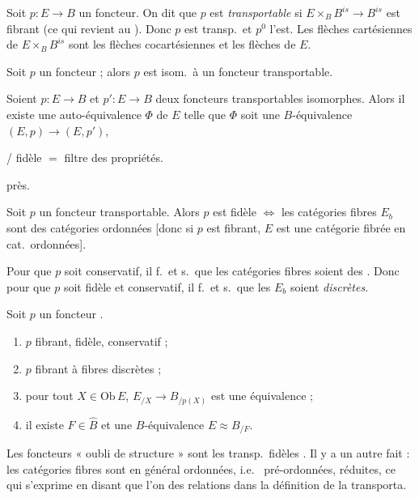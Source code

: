 \documentclass[11pt,a4paper]{article}
\begin{document}
Soit $p : E \to B$ un foncteur. On dit que $p$ est \emph{transportable} si
\struck{\ill{}} $E \times_{B} B^{is} \to B^{is}$ est fibrant (ce qui revient au
\ill{}). Donc $p$ est  transp.\ et $p^{0}$ l'est. Les flèches
cartésiennes de $E \times_{B} B^{is}$ sont les flèches cocartésiennes et
\ill{} les flèches \ill{} de $E$.

Soit $p$ un foncteur ; alors $p$ est isom.\ à un foncteur transportable.

Soient $p : E \to B$ et $p' : E \to B$ deux foncteurs transportables
isomorphes. Alors il existe  une
auto-équivalence $\Phi$ de $E$ telle que $\Phi$ soit une $B$-équivalence
$(E, p) \to (E, p')$, \ill{}

 / fidèle $=$ filtre des propriétés.


\ill{} près.

Soit $p$ un foncteur transportable. Alors $p$ est fidèle $\Longleftrightarrow$
les catégories fibres $E_{b}$ sont des catégories ordonnées [donc si $p$ est
fibrant, $E$ est une catégorie fibrée en cat.\ ordonnées].

Pour que $p$ soit conservatif, il f.\ et s.\ que les catégories fibres soient
des  .
Donc pour que $p$ soit fidèle et conservatif, il f.\ et s.\ que les $E_{b}$
soient \emph{discrètes}.

Soit $p$ un foncteur . 

\begin{enumerate}
\item[a)] $p$ fibrant, fidèle, conservatif ;
\item[b)] $p$ fibrant  à fibres discrètes ;
\item[c)]  pour tout $X \in \mathrm{Ob}\, E$,
      $E_{/X} \to B_{/p(X)}$ est une équivalence ;
\item[d)] il existe $F \in \widehat{B}$ et une $B$-équivalence
      $E \approx B_{/F}$.
\end{enumerate}

Les foncteurs « oubli de structure » sont les  transp.\
fidèles . Il y a un autre fait : les catégories fibres
sont en général \struck{\ill{}} \ill{} ordonnées, i.e.\ \ill{} pré-ordonnées,
\struck{\ill{}} réduites, ce qui s'exprime en disant \struck{\ill{}} que l'on
\ill{} des relations dans la définition de la transporta\supplied{bilité}.
\end{document}

